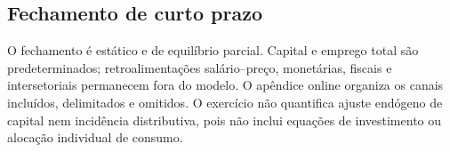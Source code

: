 \subsection{Fechamento de curto prazo}

O fechamento é estático e de equilíbrio parcial. Capital e emprego total são predeterminados; retroalimentações salário--preço, monetárias, fiscais e intersetoriais permanecem fora do modelo. O apêndice online organiza os canais incluídos, delimitados e omitidos. O exercício não quantifica ajuste endógeno de capital nem incidência distributiva, pois não inclui equações de investimento ou alocação individual de consumo.
